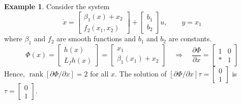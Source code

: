 \documentclass[11pt,a4paper,oneside]{book}
\numberwithin{equation}{section}
\DeclareMathOperator{\rank}{rank}
\theoremstyle{it}
\theoremstyle{definition}
\newtheorem{example}{Example}[section]
\begin{document}
\begin{example}
	Consider the system
	\begin{equation}
		\dot{x}=\begin{bmatrix} \beta_1(x)+x_2 \\[6pt] f_2(x_1,x_2)	\end{bmatrix} + \begin{bmatrix} b_1 \\[6pt] b_2	\end{bmatrix}u,\qquad y=x_1
	\end{equation}
	where $\beta_1$ and $f_2$ are smooth functions and $b_1$ and $b_2$ are constants.
	\begin{equation*}
		\Phi(x)=\begin{bmatrix} h(x) \\[6pt] L_fh(x) \end{bmatrix} = \begin{bmatrix} x_1 \\[6pt] \beta_1(x_1) + x_2 \end{bmatrix} \quad \Rightarrow \quad \frac{\partial \Phi}{\partial x}=\begin{bmatrix} 1 & 0 \\[6pt] * & 1 \end{bmatrix}
	\end{equation*}
	Hence, $\rank[\partial\Phi/\partial x]=2$ for all $x$. The solution of $[\partial \Phi/\partial x]\tau=\begin{bmatrix} 0 \\[6pt] 1 \end{bmatrix}$ is $\tau=\begin{bmatrix} 0\\[6pt]1 \end{bmatrix}$.
	

\end{example}
\end{document}
